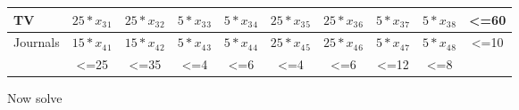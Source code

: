 \documentclass[a4paper,11pt]{scrartcl}
\begin{document}
\begin{tabular}{|l |c| c| c| c| c| c| c| c|c|}
\hline
 TV &  \begin{math} 25* x_3{}_1 \end{math}  &  \begin{math} 25* x_3{}_2 \end{math}  & \begin{math} 5* x_3{}_3 \end{math}   & \begin{math} 5* x_3{}_4 \end{math}  &  \begin{math} 25* x_3{}_5 \end{math} &  \begin{math} 25* x_3{}_6 \end{math}  &   \begin{math} 5* x_3{}_7 \end{math} &   \begin{math} 5* x_3{}_8 \end{math} & <=60\\




\hline
 Journals &  \begin{math} 15* x_4{}_1 \end{math}  &  \begin{math} 15* x_4{}_2 \end{math}  & \begin{math} 5* x_4{}_3 \end{math}   & \begin{math} 5* x_4{}_4 \end{math}  &  \begin{math} 25* x_4{}_5 \end{math} &  \begin{math} 25* x_4{}_6 \end{math}  &   \begin{math} 5* x_4{}_7 \end{math} &   \begin{math} 5* x_4{}_8 \end{math} &<=10 \\

\hline
\hline

 &  <=25 & <=35 & <=4  &  <=6 & <=4 & <=6 & <=12 & <=8 & \\
\hline




\end{tabular}

\bigskip

Now solve  
\end{document}

